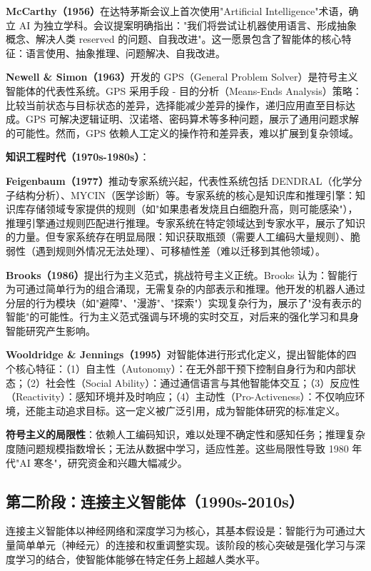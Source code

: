 \documentclass[12pt,a4paper]{article}
\begin{document}
\textbf{McCarthy（1956）}在达特茅斯会议上首次使用"Artificial Intelligence"术语，确立 AI 为独立学科。会议提案明确指出："我们将尝试让机器使用语言、形成抽象概念、解决人类 reserved 的问题、自我改进"。这一愿景包含了智能体的核心特征：语言使用、抽象推理、问题解决、自我改进。

\textbf{Newell \& Simon（1963）}开发的 GPS（General Problem Solver）是符号主义智能体的代表性系统。GPS 采用手段 - 目的分析（Means-Ends Analysis）策略：比较当前状态与目标状态的差异，选择能减少差异的操作，递归应用直至目标达成。GPS 可解决逻辑证明、汉诺塔、密码算术等多种问题，展示了通用问题求解的可能性。然而，GPS 依赖人工定义的操作符和差异表，难以扩展到复杂领域。

\textbf{知识工程时代（1970s-1980s）}：

\textbf{Feigenbaum（1977）}推动专家系统兴起，代表性系统包括 DENDRAL（化学分子结构分析）、MYCIN（医学诊断）等。专家系统的核心是知识库和推理引擎：知识库存储领域专家提供的规则（如"如果患者发烧且白细胞升高，则可能感染"），推理引擎通过规则匹配进行推理。专家系统在特定领域达到专家水平，展示了知识的力量。但专家系统存在明显局限：知识获取瓶颈（需要人工编码大量规则）、脆弱性（遇到规则外情况无法处理）、可移植性差（难以迁移到其他领域）。

\textbf{Brooks（1986）}提出行为主义范式，挑战符号主义正统。Brooks 认为：智能行为可通过简单行为的组合涌现，无需复杂的内部表示和推理。他开发的机器人通过分层的行为模块（如"避障"、"漫游"、"探索"）实现复杂行为，展示了"没有表示的智能"的可能性。行为主义范式强调与环境的实时交互，对后来的强化学习和具身智能研究产生影响。

\textbf{Wooldridge \& Jennings（1995）}对智能体进行形式化定义，提出智能体的四个核心特征：（1）自主性（Autonomy）：在无外部干预下控制自身行为和内部状态；（2）社会性（Social Ability）：通过通信语言与其他智能体交互；（3）反应性（Reactivity）：感知环境并及时响应；（4）主动性（Pro-Activeness）：不仅响应环境，还能主动追求目标。这一定义被广泛引用，成为智能体研究的标准定义。

\textbf{符号主义的局限性}：依赖人工编码知识，难以处理不确定性和感知任务；推理复杂度随问题规模指数增长；无法从数据中学习，适应性差。这些局限性导致 1980 年代"AI 寒冬"，研究资金和兴趣大幅减少。

\subsection{第二阶段：连接主义智能体（1990s-2010s）}

连接主义智能体以神经网络和深度学习为核心，其基本假设是：智能行为可通过大量简单单元（神经元）的连接和权重调整实现。该阶段的核心突破是强化学习与深度学习的结合，使智能体能够在特定任务上超越人类水平。
\end{document}
